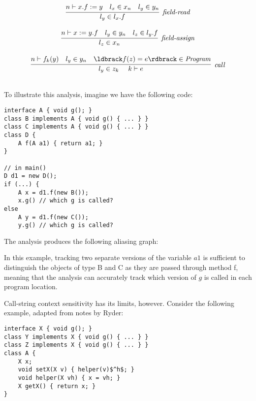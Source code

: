 \documentclass[11pt]{article}
\newcommand{\parg}[1] %
  {\ldbrack #1 \rdbrack}
\begin{document}
\begin{sloppypar}
\[\begin{array}{c}
\infer[\textit{field-read}]
	{l_y \in l_x.f}
	{n \vdash x.f := y & l_x \in x_n & l_y \in y_n}\\[3ex]
	
\infer[\textit{field-assign}]
	{l_z \in x_n}
	{n \vdash x := y.f & l_y \in y_n & l_z \in l_y.f}\\[3ex]
	
\infer[\textit{call}]
	{l_y \in z_k ~~~~ k \vdash e}
	{n \vdash f_k(y) & l_y \in y_n & \parg{f(z) = e} \in \mathit{Program}}\\[3ex]
	
\end{array}
\]

To illustrate this analysis, imagine we have the following code:

\begin{lstlisting}
interface A { void g(); }
class B implements A { void g() { ... } }
class C implements A { void g() { ... } }
class D {
    A f(A a1) { return a1; }
}

// in main()
D d1 = new D();
if (...) {
    A x = d1.f(new B());
	x.g() // which g is called?
else
    A y = d1.f(new C());
	y.g() // which g is called?
\end{lstlisting}

The analysis produces the following aliasing graph:


In this example, tracking two separate versions of the variable $a1$ is sufficient to distinguish the objects of type B and C as they are passed through method f, meaning that the analysis can accurately track which version of $g$ is called in each program location.

Call-string context sensitivity has its limits, however.  Consider the following example, adapted from notes by Ryder:

\begin{lstlisting}[mathescape]
interface X { void g(); }
class Y implements X { void g() { ... } }
class Z implements X { void g() { ... } }
class A {
	X x;
	void setX(X v) { helper(v)$^h$; }
	void helper(X vh) { x = vh; }
	X getX() { return x; }
}


\end{lstlisting}
\end{sloppypar}
\end{document}
